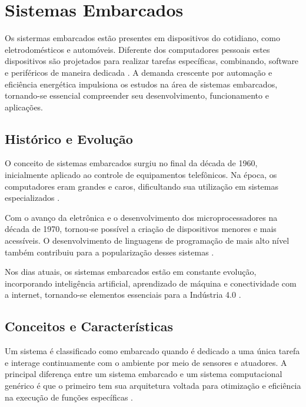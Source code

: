 \section{Sistemas Embarcados}

Os sistermas embarcados estão presentes em dispositivos do cotidiano, como eletrodomésticos e automóveis. Diferente dos computadores pessoais estes dispositivos são projetados para realizar tarefas específicas, combinando, software e periféricos de maneira dedicada \cite{Chase2007}. A demanda crescente por automação e eficiência energética impulsiona os estudos na área de sistemas embarcados, tornando-se essencial compreender seu desenvolvimento, funcionamento e aplicações. 

\subsection{Histórico e Evolução}

O conceito de sistemas embarcados surgiu no final da década de 1960, inicialmente aplicado ao controle de equipamentos telefônicos. Na época, os computadores eram grandes e caros, dificultando sua utilização em sistemas especializados \cite{Chase2007}.

Com o avanço da eletrônica e o desenvolvimento dos microprocessadores na década de 1970, tornou-se possível a criação de dispositivos menores e mais acessíveis. O desenvolvimento de linguagens de programação de mais alto nível também contribuiu para a popularização desses sistemas \cite{Chase2007}.

Nos dias atuais, os sistemas embarcados estão em constante evolução, incorporando inteligência artificial, aprendizado de máquina e conectividade com a internet, tornando-se elementos essenciais para a Indústria 4.0 \cite{Chase2007}.


\subsection{Conceitos e Características}

Um sistema é classificado como embarcado quando é dedicado a uma única tarefa e interage continuamente com o ambiente por meio de sensores e atuadores. A principal diferença entre um sistema embarcado e um sistema computacional genérico é que o primeiro tem sua arquitetura voltada para otimização e eficiência na execução de funções específicas \cite{Chase2007}.

